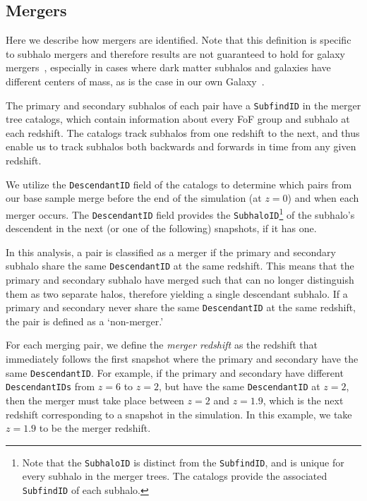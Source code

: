 \documentclass[twocolumn,linenumbers]{aastex631}
\begin{document}
\subsection{Mergers} \label{subsec:mergers}
Here we describe how mergers are identified. 
Note that this definition is specific to subhalo mergers and therefore results are not guaranteed to hold for galaxy mergers~\citep[see e.g.,][]{RG2015,Patton2024}, especially in cases where dark matter subhalos and galaxies have different centers of mass, as is the case in our own Galaxy~\citep{Gomez2015,GaravitoCamargo2019,Petersen2021,Chamberlain2023}. %


The primary and secondary subhalos of each pair have a \texttt{SubfindID} in the \subfind{} merger tree catalogs, which contain information about every FoF group and subhalo at each redshift. 
The \sublink{} catalogs track subhalos from one redshift to the next, and thus enable us to track subhalos both backwards and forwards in time from any given redshift. 

We utilize the \texttt{DescendantID} field of the \sublink{} catalogs to determine which pairs from our base sample merge before the end of the simulation (at $z=0$) and when each merger occurs. 
The \texttt{DescendantID} field provides the \texttt{SubhaloID}\footnote{Note that the \texttt{SubhaloID} is distinct from the \texttt{SubfindID}, and is unique for every subhalo in the merger trees. 
The \sublink{} catalogs provide the associated \texttt{SubfindID} of each subhalo.} of the subhalo's descendent in the next (or one of the following) snapshots, if it has one. 

In this analysis, a pair is classified as a merger if the primary and secondary subhalo share the same \texttt{DescendantID} at the same redshift. 
This means that the primary and secondary subhalo have merged such that \subfind{} can no longer distinguish them as two separate halos, therefore yielding a single descendant subhalo.
If a primary and secondary never share the same \texttt{DescendantID} at the same redshift, the pair is defined as a `non-merger.'

For each merging pair, we define the \emph{merger redshift} as the redshift that immediately follows the first snapshot where the primary and secondary have the same \texttt{DescendantID}. 
For example, if the primary and secondary have different \texttt{DescendantIDs} from $z=6$ to $z=2$, but have the same \texttt{DescendantID} at $z=2$, then the merger must take place between $z=2$ and $z=1.9$, which is the next redshift corresponding to a snapshot in the simulation. 
In this example, we take $z=1.9$ to be the merger redshift. 
\end{document}
